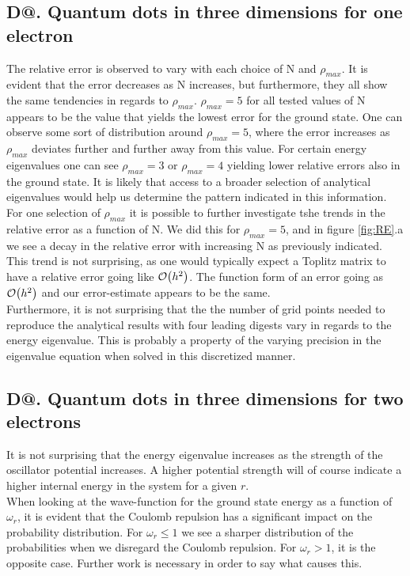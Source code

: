 \documentclass[%
reprint,
amsmath, 
amssymb, 
aps,]{revtex4-1}
\makeatletter
\newcommand*{\rom}[1]{\expandafter\@slowromancap\romannumeral #1@}
\makeatother
\begin{document}
		\subsection*{D\rom{2}. Quantum dots in three dimensions for one electron} \noindent 
The relative error is observed to vary with each choice of N and $\rho_{max}$. It is evident that the error decreases as N increases, but furthermore, they all show the same tendencies in regards to $\rho_{max}$. $\rho_{max} = 5$ for all tested values of N appears to be the value that yields the lowest error for the ground state. One can observe some sort of distribution around $\rho_{max} = 5$, where the error increases as $\rho_{max}$ deviates further and further away from this value. For certain energy eigenvalues one can see $\rho_{max} = 3$ or $\rho_{max} = 4$ yielding lower relative errors also in the ground state. It is likely that access to a broader selection of analytical eigenvalues would help us determine the pattern indicated in this information. \\ \indent 
For one selection of $\rho_{max}$ it is possible to further investigate tshe trends in the relative error as a function of N. We did this for $\rho_{max} = 5$, and in figure \ref{fig:RE}.a we see a decay in the relative error with increasing N as previously indicated. This trend is not surprising, as one would typically expect a Toplitz matrix to have a relative error going like $\order{h^2}$. The function form of an error going as $\order{h^2}$ and our error-estimate appears to be the same. \\ \indent 
Furthermore, it is not surprising that the the number of grid points needed to reproduce the analytical results with four leading digests vary in regards to the energy eigenvalue. This is probably a property of the varying precision in the eigenvalue equation when solved in this discretized manner.  

		\subsection*{D\rom{3}. Quantum dots in three dimensions for two electrons} \noindent 
It is not surprising that the energy eigenvalue increases as the strength of the oscillator potential increases. A higher potential strength will of course indicate a higher internal energy in the system for a given $r$.  \\
When looking at the wave-function for the ground state energy as a function of $\omega_r$, it is evident that the Coulomb repulsion has a significant impact on the probability distribution. For $\omega_r \leq 1 $ we see a sharper distribution of the probabilities when we disregard the Coulomb repulsion. For $\omega_r > 1$, it is the opposite case. Further work is necessary in order to say what causes this. 
\end{document}
